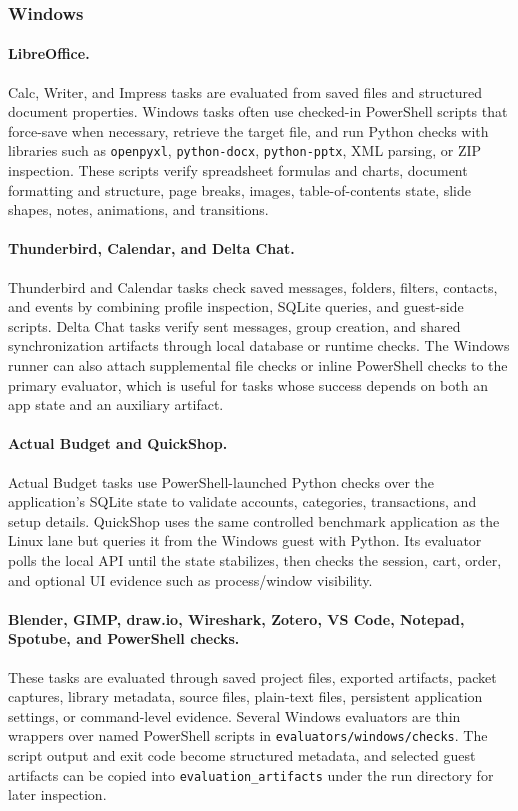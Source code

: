 \subsubsection{Windows}
\paragraph{LibreOffice.}
Calc, Writer, and Impress tasks are evaluated from saved files and structured document properties. Windows tasks often use checked-in PowerShell scripts that force-save when necessary, retrieve the target file, and run Python checks with libraries such as \texttt{openpyxl}, \texttt{python-docx}, \texttt{python-pptx}, XML parsing, or ZIP inspection. These scripts verify spreadsheet formulas and charts, document formatting and structure, page breaks, images, table-of-contents state, slide shapes, notes, animations, and transitions.

\paragraph{Thunderbird, Calendar, and Delta Chat.}
Thunderbird and Calendar tasks check saved messages, folders, filters, contacts, and events by combining profile inspection, SQLite queries, and guest-side scripts. Delta Chat tasks verify sent messages, group creation, and shared synchronization artifacts through local database or runtime checks. The Windows runner can also attach supplemental file checks or inline PowerShell checks to the primary evaluator, which is useful for tasks whose success depends on both an app state and an auxiliary artifact.

\paragraph{Actual Budget and QuickShop.}
Actual Budget tasks use PowerShell-launched Python checks over the application's SQLite state to validate accounts, categories, transactions, and setup details. QuickShop uses the same controlled benchmark application as the Linux lane but queries it from the Windows guest with Python. Its evaluator polls the local API until the state stabilizes, then checks the session, cart, order, and optional UI evidence such as process/window visibility.

\paragraph{Blender, GIMP, draw.io, Wireshark, Zotero, VS Code, Notepad, Spotube, and PowerShell checks.}
These tasks are evaluated through saved project files, exported artifacts, packet captures, library metadata, source files, plain-text files, persistent application settings, or command-level evidence. Several Windows evaluators are thin wrappers over named PowerShell scripts in \texttt{evaluators/windows/checks}. The script output and exit code become structured metadata, and selected guest artifacts can be copied into \texttt{evaluation\_artifacts} under the run directory for later inspection.

